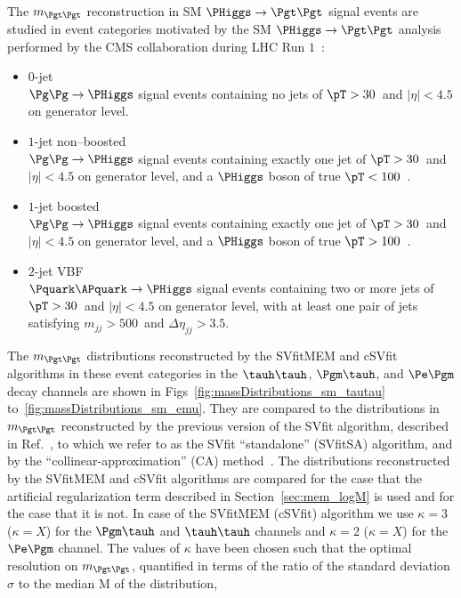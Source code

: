 The $m_{\Pgt\Pgt}$ reconstruction in SM $\PHiggs \to \Pgt\Pgt$ signal events are studied in event categories motivated by the
SM $\PHiggs \to \Pgt\Pgt$ analysis performed by the CMS collaboration during LHC Run $1$~\cite{HIG-13-004}:
\begin{itemize}
\item $0$-jet \\
  $\Pg\Pg \to \PHiggs$ signal events 
  containing no jets of $\pT > 30$~\GeV and $\lvert \eta \rvert < 4.5$ on generator level.
\item $1$-jet non--boosted \\
  $\Pg\Pg \to \PHiggs$ signal events 
  containing exactly one jet of $\pT > 30$~\GeV and $\lvert \eta \rvert < 4.5$ on generator level,
  and a $\PHiggs$ boson of true $\pT < 100$~\GeV.
\item $1$-jet boosted \\
  $\Pg\Pg \to \PHiggs$ signal events 
  containing exactly one jet of $\pT > 30$~\GeV and $\lvert \eta \rvert < 4.5$ on generator level,
  and a $\PHiggs$ boson of true $\pT > 100$~\GeV.
\item $2$-jet VBF \\
  $\Pquark\APquark \to \PHiggs$ signal events
  containing two or more jets of $\pT > 30$~\GeV and $\lvert \eta \rvert < 4.5$ on generator level,
  with at least one pair of jets satisfying $m_{jj} > 500$~\GeV and $\Delta\eta_{jj} > 3.5$.
\end{itemize}
The $m_{\Pgt\Pgt}$ distributions reconstructed by the SVfitMEM and cSVfit algorithms in these event categories 
in the $\tauh\tauh$, $\Pgm\tauh$, and $\Pe\Pgm$ decay channels are shown in Figs~\ref{fig:massDistributions_sm_tautau} to~\ref{fig:massDistributions_sm_emu}.
They are compared to the distributions in $m_{\Pgt\Pgt}$  reconstructed by the previous version of the
SVfit algorithm, described in Ref.~\cite{SVfit}, to which we refer to as the SVfit ``standalone'' (SVfitSA) algorithm,
and by the ``collinear-approximation'' (CA) method~\cite{massRecoCollinearApprox}.
The distributions reconstructed by the SVfitMEM and cSVfit algorithms are compared
for the case that the artificial regularization term described in Section~\ref{sec:mem_logM} is used and for the case that it is not.
In case of the SVfitMEM (cSVfit) algorithm we use $\kappa = 3$ ($\kappa = X$) for the $\Pgm\tauh$ and $\tauh\tauh$ channels and $\kappa = 2$ ($\kappa = X$) for the $\Pe\Pgm$ channel.
The values of $\kappa$ have been chosen such that the optimal resolution on $m_{\Pgt\Pgt}$, 
quantified in terms of the ratio of the standard deviation $\sigma$ to the median $\textrm{M}$ of the distribution,
